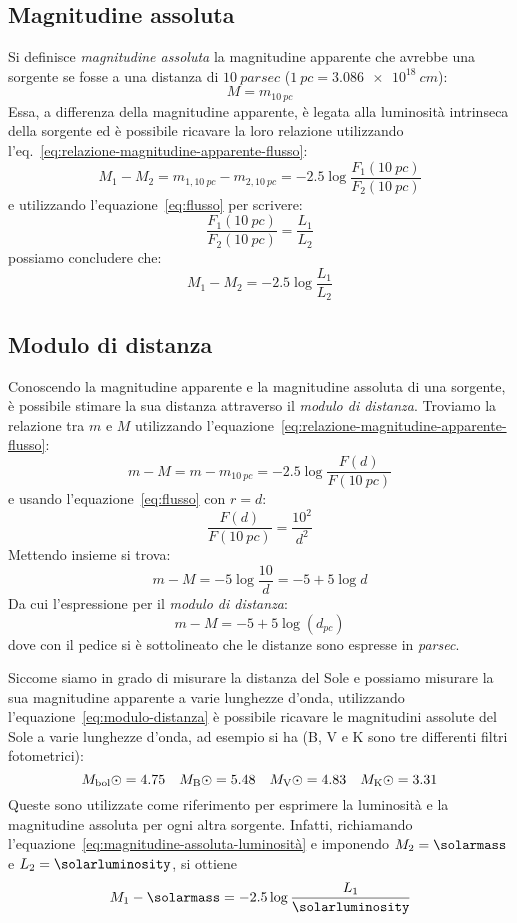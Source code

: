 \subsection{Magnitudine assoluta}\label{sec:magnitudine-assoluta}
Si definisce \emph{magnitudine assoluta} la magnitudine apparente che avrebbe una sorgente se fosse a una distanza di $\SI{10}{parsec}$ ($\SI{1}{pc} = \SI{3.086e18}{cm}$):
\begin{equation}\label{eq:magnitudine-assoluta}
    M = m_{\SI{10}{pc}}
\end{equation}
Essa, a differenza della magnitudine apparente, è legata alla luminosità intrinseca della sorgente ed è possibile ricavare la loro relazione utilizzando l'eq.~\eqref{eq:relazione-magnitudine-apparente-flusso}:
\[
    M_1 - M_2 = m_{1, \SI{10}{pc}} - m_{2, \SI{10}{pc}} = -2.5 \log\frac{F_1 (\SI{10}{pc})}{F_2 (\SI{10}{pc})}
\]
e utilizzando l'equazione~\eqref{eq:flusso} per scrivere:
\[
    \frac{F_1 (\SI{10}{pc})}{F_2 (\SI{10}{pc})} = \frac{L_1}{L_2}
\]
possiamo concludere che:
\begin{equation}\label{eq:magnitudine-assoluta-luminosità}
    M_1 - M_2 = -2.5 \log\frac{L_1}{L_2}
\end{equation}

\subsection{Modulo di distanza}
Conoscendo la magnitudine apparente e la magnitudine assoluta di una sorgente, è possibile stimare la sua distanza attraverso il \emph{modulo di distanza}. Troviamo la relazione tra $m$ e $M$ utilizzando l'equazione~\eqref{eq:relazione-magnitudine-apparente-flusso}:
\[
    m - M = m - m_{\SI{10}{pc}} = -2.5 \log\frac{F(d)}{F(\SI{10}{pc})}
\]
e usando l'equazione~\eqref{eq:flusso} con $r=d$:
\[
    \frac{F(d)}{F(\SI{10}{pc})} = \frac{10^2}{d^2}
\]
Mettendo insieme si trova:
\[
    m - M = -5 \log\frac{10}{d} = -5 + 5 \log d
\]
Da cui l'espressione per il \emph{modulo di distanza}:
\begin{equation}\label{eq:modulo-distanza}
    m - M = -5 + 5 \log(d_{\si{pc}})
\end{equation}
dove con il pedice si è sottolineato che le distanze sono espresse in \emph{parsec}.

Siccome siamo in grado di misurare la distanza del Sole e possiamo misurare la sua magnitudine apparente a varie lunghezze d'onda, utilizzando l'equazione~\eqref{eq:modulo-distanza} è possibile ricavare le magnitudini assolute del Sole a varie lunghezze d'onda, ad esempio si ha (B, V e K sono tre differenti filtri fotometrici):
\[
    M_\ensuremath{\textup{bol}\odot} = 4.75 \quad M_\ensuremath{\textup{B}\odot} = 5.48 \quad M_\ensuremath{\textup{V}\odot} = 4.83 \quad M_\ensuremath{\textup{K}\odot} = 3.31
\]
Queste sono utilizzate come riferimento per esprimere la luminosità e la magnitudine assoluta per ogni altra sorgente. Infatti, richiamando l'equazione~\eqref{eq:magnitudine-assoluta-luminosità} e imponendo $M_2 = \si{\solarmass}$ e $L_2 = \si{\solarluminosity}$, si ottiene
\begin{equation}\label{eq:magnitudine-assoluta-luminosità-sole}
    M_1 - \si{\solarmass} = -2.5 \log\frac{L_1}{\si{\solarluminosity}}
\end{equation}